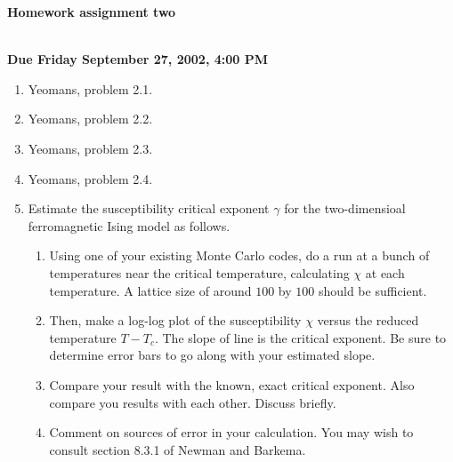 
\oddsidemargin=0in
\textwidth=6.5in

\renewcommand{\arraystretch}{1.3}



\pagestyle{empty}

\begin{center}
{\large {\bf Homework assignment two}}\\
\end{center}
\bigskip
\hspace{1cm}\\


{\bf Due Friday September 27, 2002, 4:00 PM} \\

\begin{enumerate}

\item Yeomans, problem 2.1.

\item Yeomans, problem 2.2.

\item Yeomans, problem 2.3.

\item Yeomans, problem 2.4.

\item Estimate the susceptibility critical exponent $\gamma$ for the
two-dimensioal ferromagnetic Ising model as follows.

\begin{enumerate}

\item Using one of your existing Monte Carlo codes, do a run at a
bunch of temperatures near the critical temperature, calculating
$\chi$ at each temperature.  A lattice size of around $100$ by $100$
should be sufficient. 

\item Then, make a log-log plot of the susceptibility $\chi$ versus
the reduced temperature $T-T_c$.  The slope of line is the critical
exponent.  Be sure to determine error bars to go along with your
estimated slope.

\item Compare your result with the known, exact critical exponent.
Also compare you results with each other.  Discuss briefly.

\item Comment on sources of error in your calculation.  You may wish
to consult section 8.3.1 of Newman and Barkema.

\end{enumerate}

\end{enumerate}






